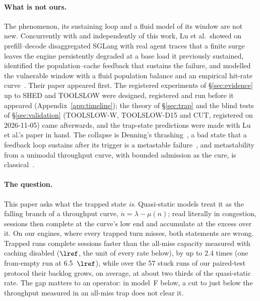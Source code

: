 \paragraph{What is not ours.} The phenomenon, its sustaining loop and a fluid model of its window are not new. Concurrently with
and independently of this work, Lu et al.\ showed on prefill--decode disaggregated SGLang with real agent traces that a finite surge
leaves the engine persistently degraded at a base load it previously sustained, identified the population--cache feedback that
sustains the failure, and modelled the vulnerable window with a fluid population balance and an empirical hit-rate
curve~\citep{lu2026cachetrap}. Their paper appeared first. The registered experiments of \S\ref{sec:evidence} up to SHED and TOOLSLOW were designed,
registered and run before it appeared (Appendix~\ref{app:timeline}); the theory of \S\ref{sec:trap} and the blind tests of
\S\ref{sec:validation} (TOOLSLOW-W, TOOLSLOW-D15 and CUT, registered on 2026-11-05) came afterwards, and the trap-state predictions
were made with Lu et al.'s paper in hand. The collapse is Denning's thrashing~\citep{denning1968thrashing}, a bad state that a feedback
loop sustains after its trigger is a metastable failure~\citep{bronson2021metastable,huang2022metastable}, and metastability from a
unimodal throughput curve, with bounded admission as the cure, is
classical~\citep{kleinrock1975aloha,carleial1975bistable,nelson1987stochastic}.

\paragraph{The question.} This paper asks what the trapped state \emph{is}. Quasi-static models treat it as the falling branch
of a throughput curve, $\dot n=\lambda-\mu(n)$; read literally in congestion, sessions then complete at the curve's low end and
accumulate at the excess over it. On our engines, where every trapped turn misses, both statements are wrong. Trapped runs
complete sessions faster than the all-miss capacity measured with caching disabled ($\lref$, the unit of every rate below), by up
to 2.4 times (one from-empty run at 6.5~$\lref$), while over the 57 stuck runs of our paired-test protocol their backlog grows, on average, at about two thirds of the
quasi-static rate. The gap matters to an operator: in model~F below, a cut to just below the throughput
measured in an all-miss trap does not clear it.


